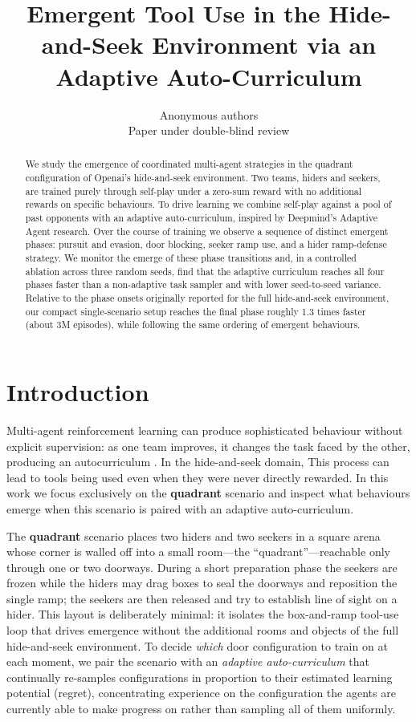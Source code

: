 \documentclass{article}
\title{Emergent Tool Use in the Hide-and-Seek Environment via an Adaptive Auto-Curriculum}
\author{Anonymous authors\\Paper under double-blind review}
\begin{document}
\maketitle

\begin{abstract}

We study the emergence of coordinated multi-agent strategies in the
quadrant configuration of Openai's hide-and-seek environment. Two teams,
hiders and seekers, are trained purely through self-play under a zero-sum
reward with no additional rewards on specific behaviours. To drive learning we combine
self-play against a pool of past opponents with an adaptive
auto-curriculum, inspired by Deepmind's
Adaptive Agent research. Over the course of training we observe a
sequence of distinct emergent phases: pursuit and evasion, door blocking, seeker ramp use, and a hider ramp-defense strategy. We
monitor the emerge of these phase transitions and, in a controlled
ablation across three random seeds, find that the adaptive curriculum reaches all
four phases faster than a non-adaptive task
sampler and with lower seed-to-seed variance. Relative to the phase onsets
originally reported for the full hide-and-seek environment, our compact
single-scenario setup reaches the final phase roughly 1.3 times
faster (about 3M episodes), while following the same ordering of
emergent behaviours.

\end{abstract}

\section{Introduction}

Multi-agent reinforcement learning can produce sophisticated
behaviour without explicit supervision: as one team improves, it changes the
task faced by the other, producing an autocurriculum
\citep{baker2019emergent}. In the hide-and-seek domain, This process can lead to tools being used even when they were never directly rewarded. In this work we focus
exclusively on the \textbf{quadrant} scenario and inspect what behaviours emerge when this scenario is paired with an adaptive auto-curriculum.

The \textbf{quadrant} scenario places two hiders and two seekers in a square
arena whose corner is walled off into a small room---the ``quadrant''---reachable
only through one or two doorways. During a short preparation phase the seekers are
frozen while the hiders may drag boxes to seal the doorways and reposition the
single ramp; the seekers are then released and try to establish line of sight on a
hider. This layout is deliberately minimal: it isolates the box-and-ramp tool-use
loop that drives emergence without the additional rooms and objects of the full
hide-and-seek environment. To decide \emph{which} door configuration to train on at
each moment, we pair the scenario with an \emph{adaptive auto-curriculum} that
continually re-samples configurations in proportion to their estimated learning
potential (regret), concentrating experience on the configuration the agents are
currently able to make progress on rather than sampling all of them uniformly.
\end{document}
